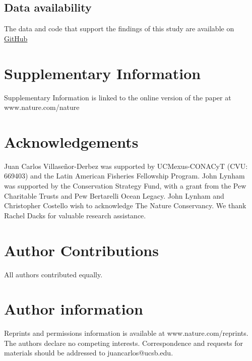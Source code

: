 \documentclass[12pt]{article}
\begin{document}
\subsection{Data availability}

The data and code that support the findings of this study are available on \href{https://github.com/jcvdav/MPA_displacement}{GitHub}




\section{Supplementary Information}

Supplementary Information is linked to the online version of the paper at www.nature.com/nature

\section{Acknowledgements}

Juan Carlos Villaseñor-Derbez was supported by UCMexus-CONACyT (CVU: 669403) and the Latin American Fisheries Fellowship Program. John Lynham was supported by the Conservation Strategy Fund, with a grant from the Pew Charitable Trusts and Pew Bertarelli Ocean Legacy. John Lynham and Christopher Costello wish to acknowledge The Nature Conservancy. We thank Rachel Dacks for valuable research assistance.


\section{Author Contributions}

All authors contributed equally.

\section{Author information}

Reprints and permissions information is available at www.nature.com/reprints. The authors declare no competing interests. Correspondence and requests for materials should be addressed to juancarlos@ucsb.edu.

\clearpage

\FloatBarrier
\end{document}
